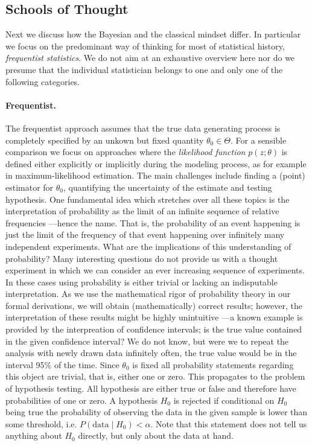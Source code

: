 \subsection{Schools of Thought}
Next we discuss how the Bayesian and the classical mindset differ. In particular we focus on the predominant way of thinking for most of statistical history, \textit{frequentist statistics}. We do not aim at an exhaustive overview here nor do we presume that the individual statistician belongs to one and only one of the following categories.

\paragraph{Frequentist.} The frequentist approach assumes that the true data generating process is completely specified by an unkown but fixed quantity $\theta_0 \in \Theta$.
For a sensible comparison we focus on approaches where the \emph{likelihood function} $p(z; \theta)$ is defined either explicitly or implicitly during the modeling process, as for example in maximum-likelihood estimation.
The main challenges include finding a (point) estimator for $\theta_0$, quantifying the uncertainty of the estimate and testing hypothesis.
One fundamental idea which stretches over all these topics is the interpretation of probability as the limit of an infinite sequence of relative frequencies ---hence the name.
That is, the probability of an event happening is just the limit of the frequency of that event happening over infinitely many independent experiments.
What are the implications of this understanding of probability?
Many interesting questions do not provide us with a thought experiment in which we can consider an ever increasing sequence of experiments.
In these cases using probability is either trivial or lacking an indisputable interpretation.
As we use the mathematical rigor of probability theory in our formal derivations, we will obtain (mathematically) correct results; however, the interpretation of these results might be highly unintuitive ---a known example is provided by the interpreation of confidence intervals; is the true value contained in the given confidence interval? We do not know, but were we to repeat the analysis with newly drawn data infinitely often, the true value would be in the interval 95\% of the time.
Since $\theta_0$ is fixed all probability statements regarding this object are trivial, that is, either one or zero. This propagates to the problem of hypothesis testing.
All hypothesis are either true or false and therefore have probabilities of one or zero.
A hypothesis $H_0$ is rejected if conditional on $H_0$ being true the probability of observing the data in the given sample is lower than some threshold, i.e. $P(\text{data} \mid H_0) < \alpha$.
Note that this statement does not tell us anything about $H_0$ directly, but only about the data at hand.


